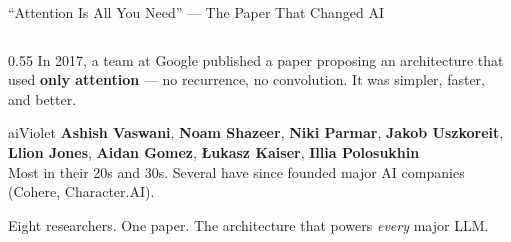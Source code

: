 \begin{frame}[shrink=13]{``Attention Is All You Need'' --- The Paper That Changed AI}

  \begin{columns}[T]
    \begin{column}{0.55\textwidth}
      {\small In 2017, a team at Google published a paper proposing an
      architecture that used \textbf{only attention} --- no recurrence,
      no convolution. It was simpler, faster, and better.}

      \vspace{0.4em}

      \begin{personbox}{aiViolet}
        \textbf{Ashish Vaswani}, \textbf{Noam Shazeer},
        \textbf{Niki Parmar}, \textbf{Jakob Uszkoreit},
        \textbf{Llion Jones}, \textbf{Aidan Gomez},
        \textbf{{\L}ukasz Kaiser}, \textbf{Illia Polosukhin}\\[3pt]
        Most in their 20s and 30s. Several have since founded major AI
        companies (Cohere, Character.AI).
      \end{personbox}

      \vspace{0.3em}
      \begin{insightbox}
        Eight researchers. One paper. The architecture that powers
        \emph{every} major LLM.
      \end{insightbox}
    \end{column}


\end{columns}
\end{frame}

